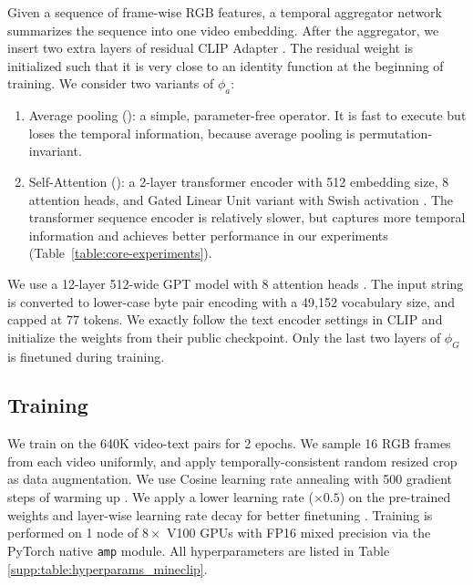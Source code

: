  Given a sequence of frame-wise RGB features, a temporal aggregator network summarizes the sequence into one video embedding. After the aggregator, we insert two extra layers of residual CLIP Adapter \cite{gao2021clipadapter}. The residual weight is initialized such that it is very close to an identity function at the beginning of training. We consider two variants of $\phi_a$:

\begin{enumerate}
    \item Average pooling (\mineclipavg): a simple, parameter-free operator. It is fast to execute but loses the temporal information, because average pooling is permutation-invariant. 
    \item Self-Attention (\mineclipattn): a 2-layer transformer encoder with 512 embedding size, 8 attention heads, and Gated Linear Unit variant with Swish activation \cite{shazeer2020glu,chowdhery2022palm}. The transformer sequence encoder is relatively slower, but captures more temporal information and achieves better performance in our experiments (Table~\ref{table:core-experiments}).
\end{enumerate}



 We use a 12-layer 512-wide GPT model with 8 attention heads \cite{radford2018gpt,radford2019gpt2}. The input string is converted to lower-case byte pair encoding with a 49,152 vocabulary size, and capped at 77 tokens. We exactly follow the text encoder settings in CLIP and initialize the weights from their public checkpoint. Only the last two layers of $\phi_G$ is finetuned during training.  

\subsection{Training}

We train \mineclip on the 640K video-text pairs for 2 epochs. 
We sample 16 RGB frames from each video uniformly, and apply temporally-consistent random resized crop \cite{carreira2017i3d,fan2020rubiks} as data augmentation. 
We use Cosine learning rate annealing with 500 gradient steps of warming up \cite{loshchilov17cosinelr}. We apply a lower learning rate  ($\times 0.5$) on the pre-trained weights and layer-wise learning rate decay for better finetuning \cite{he2021mae}. Training is performed on 1 node of $8 \times$ V100 GPUs with FP16 mixed precision \cite{micikevicius2018mixedprecision} via the PyTorch native \texttt{amp} module. All hyperparameters are listed in Table \ref{supp:table:hyperparams_mineclip}.



